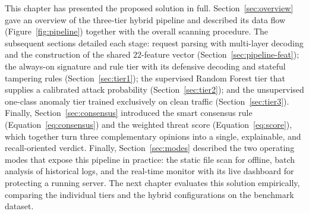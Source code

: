 \documentclass[../main.tex]{subfiles}
\begin{document}
This chapter has presented the proposed solution in full. Section~\ref{sec:overview}
gave an overview of the three-tier hybrid pipeline and described its data
flow (Figure~\ref{fig:pipeline}) together with the overall scanning
procedure. The subsequent sections detailed each stage: request parsing with
multi-layer decoding and the construction of the shared $22$-feature vector
(Section~\ref{sec:pipeline-feat}); the always-on signature and rule tier with
its defensive decoding and stateful tampering rules (Section~\ref{sec:tier1});
the supervised Random Forest tier that supplies a calibrated attack
probability (Section~\ref{sec:tier2}); and the unsupervised one-class anomaly
tier trained exclusively on clean traffic (Section~\ref{sec:tier3}). Finally,
Section~\ref{sec:consensus} introduced the smart consensus rule
(Equation~\eqref{eq:consensus}) and the weighted threat score
(Equation~\eqref{eq:score}), which together turn three complementary opinions
into a single, explainable, and recall-oriented verdict. Finally,
Section~\ref{sec:modes} described the two operating modes that expose this
pipeline in practice: the static file scan for offline, batch analysis of
historical logs, and the real-time monitor with its live dashboard for
protecting a running server. The next chapter evaluates this solution
empirically, comparing the individual tiers and the hybrid configurations on
the benchmark dataset.
\end{document}
